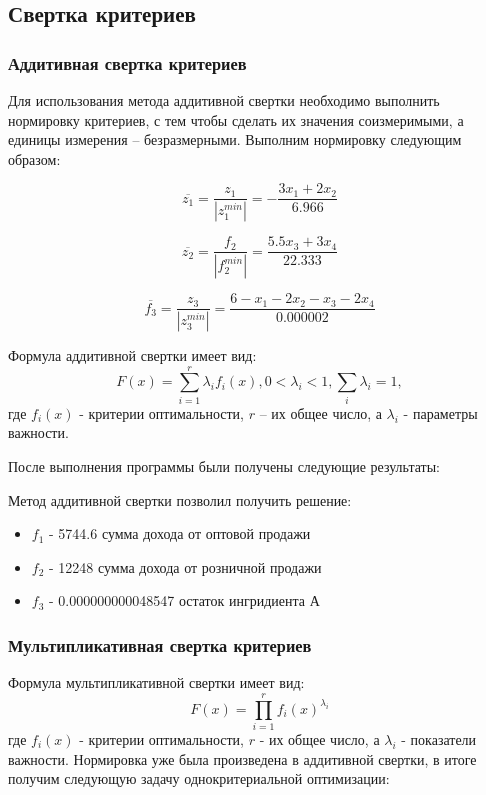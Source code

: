 \documentclass[14pt,a4paper,report]{report}
\begin{document}
\subsection{Свертка критериев}
\subsubsection{Аддитивная свертка критериев}
Для использования метода аддитивной свертки необходимо выполнить нормировку критериев, с тем чтобы сделать их значения соизмеримыми, а единицы измерения – безразмерными. Выполним нормировку следующим образом:


    
    
\begin{equation}
\overline{z_1} = \frac{z_1}{|z_1^{min}|} =
-\frac{3x_1 + 2x_2}{6.966}
\end{equation}

\begin{equation}
\overline{z_2} = \frac{f_2}{|f_2^{min}|} = \frac{5.5x_3 + 3x_4} {22.333} 
\end{equation}

\begin{equation}
\overline{f_3} = \frac{z_3}{|z_3^{min}|} = \frac{6 - x_1 - 2x_2 - x_3 - 2x_4 }{0.000002} 
\end{equation}

Формула аддитивной свертки имеет вид:
\begin{equation}
F(x) = \sum_{i=1}^{r}\lambda_i f_i(x), 0<\lambda_i<1, \sum_i^{}\lambda_i=1,
\end{equation}
где $f_i(x)$ - критерии оптимальности, $r$ – их общее число, а $\lambda_i$ - параметры важности. 



После выполнения программы были получены следующие результаты:



Метод аддитивной свертки позволил получить решение:
\begin{itemize}
\item $f_1$ - 5744.6 сумма дохода от оптовой продажи
\item $f_2$ - 12248 сумма дохода от розничной продажи
\item $f_3$ - 0.000000000048547 остаток ингридиента А
\end{itemize}






\subsubsection{Мультипликативная свертка критериев}
Формула мультипликативной свертки имеет вид:
\begin{equation}
F(x) = \prod_{i=1}^{r}f_i(x)^{\lambda_i}
\end{equation}
где $f_i(x)$ - критерии оптимальности, $r$ - их общее число, а $\lambda_i$ - показатели важности. Нормировка уже была произведена в аддитивной свертки, в итоге получим следующую задачу однокритериальной оптимизации:
\end{document}
